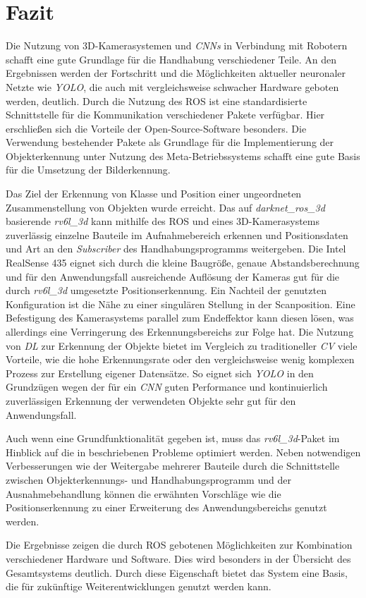 \chapter{Fazit}

Die Nutzung von 3D-Kamerasystemen und \textit{\acp{CNN}} in Verbindung mit Robotern schafft eine gute Grundlage für die Handhabung verschiedener Teile. An den Ergebnissen werden der Fortschritt und die Möglichkeiten aktueller neuronaler Netzte wie \textit{\ac{YOLO}}, die auch mit vergleichsweise schwacher Hardware geboten werden, deutlich. Durch die Nutzung des \ac{ROS} ist eine standardisierte Schnittstelle für die Kommunikation verschiedener Pakete verfügbar. Hier erschließen sich die Vorteile der Open-Source-Software besonders. Die Verwendung bestehender Pakete als Grundlage für die Implementierung der Objekterkennung unter Nutzung des Meta-Betriebssystems schafft eine gute Basis für die Umsetzung der Bilderkennung. 

Das Ziel der Erkennung von Klasse und Position einer ungeordneten Zusammenstellung von Objekten wurde erreicht. Das auf \textit{darknet\_ros\_3d} basierende \textit{rv6l\_3d} kann mithilfe des \ac{ROS} und eines 3D-Kamerasystems zuverlässig einzelne Bauteile im Aufnahmebereich erkennen und Positionsdaten und Art an den \textit{Subscriber} des Handhabungsprogramms weitergeben. Die Intel RealSense 435 eignet sich durch die kleine Baugröße, genaue Abstandsberechnung und für den Anwendungsfall ausreichende Auflösung der Kameras gut für die durch \textit{rv6l\_3d} umgesetzte Positionserkennung. Ein Nachteil der genutzten Konfiguration ist die Nähe zu einer singulären Stellung in der Scanposition. Eine Befestigung des Kamerasystems parallel zum Endeffektor kann diesen lösen, was allerdings eine Verringerung des Erkennungsbereichs zur Folge hat. Die Nutzung von \textit{\ac{DL}} zur Erkennung der Objekte bietet im Vergleich zu traditioneller \textit{\ac{CV}} viele Vorteile, wie die hohe Erkennungsrate oder den vergleichsweise wenig komplexen Prozess zur Erstellung eigener Datensätze. So eignet sich \textit{\ac{YOLO}} in den Grundzügen wegen der für ein \textit{\ac{CNN}} guten Performance und kontinuierlich zuverlässigen Erkennung der verwendeten Objekte sehr gut für den Anwendungsfall.

Auch wenn eine Grundfunktionalität gegeben ist, muss das \textit{rv6l\_3d}-Paket im Hinblick auf die in  beschriebenen Probleme optimiert werden. Neben notwendigen Verbesserungen wie der Weitergabe mehrerer Bauteile durch die Schnittstelle zwischen Objekterkennungs- und Handhabungsprogramm und der Ausnahmebehandlung können die erwähnten Vorschläge wie die Positionserkennung zu einer Erweiterung des Anwendungsbereichs genutzt werden.

Die Ergebnisse zeigen die durch \ac{ROS} gebotenen Möglichkeiten zur Kombination verschiedener Hardware und Software. Dies wird besonders in der Übersicht des Gesamtsystems  deutlich. Durch diese Eigenschaft bietet das System eine Basis, die für zukünftige Weiterentwicklungen genutzt werden kann.